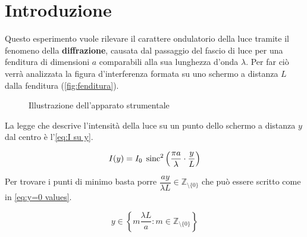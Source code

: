 \documentclass[../main.tex]{subfiles}
\begin{document}
\section{Introduzione}

Questo esperimento vuole rilevare il carattere ondulatorio della luce tramite il fenomeno della \textbf{diffrazione}, causata dal passaggio del fascio di luce per una fenditura di dimensioni $a$ comparabili alla sua lunghezza d'onda $\lambda$. Per far ciò verrà analizzata la figura d'interferenza formata su uno schermo a distanza $L$ dalla fenditura (\autoref{fig:fenditura}).

\begin{figure}[ht!]
    \centering
    \caption{Illustrazione dell'apparato strumentale}
    \label{fig:fenditura}
\end{figure}

La legge che descrive l'intensità della luce su un punto dello schermo a distanza $y$ dal centro è l'\autoref{eq:I su y}.







\begin{equation} \label{eq:I su y}
    I(y) = I_{0} \; \operatorname{sinc}^{2} \left( \frac{\pi a}{\lambda} \cdot \frac{y}{L}  \right)
\end{equation}

Per trovare i punti di minimo basta porre $\dfrac{a y}{\lambda L} \in \mathbb{Z}_{\setminus \{0\}}$ che può essere scritto come in \autoref{eq:y=0 values}.

\begin{equation} \label{eq:y=0 values}
    y \in \left\{m\frac{\lambda L}{a}: m \in \mathbb{Z}_{\setminus \{0\}} \right\}
\end{equation}

\end{document}
